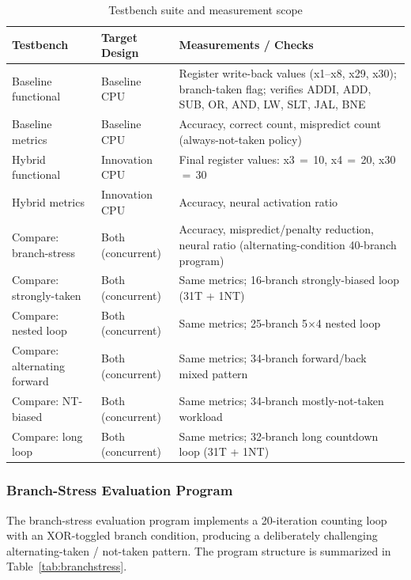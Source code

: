 \documentclass[12pt,a4paper]{article}
\begin{document}
\begin{table}[htbp]
  \centering
  \caption{Testbench suite and measurement scope}
  \label{tab:testbenches}
  \begin{tabularx}{\linewidth}{lYY}
    \toprule
    \textbf{Testbench} & \textbf{Target Design} & \textbf{Measurements / Checks} \\
    \midrule
    Baseline functional
      & Baseline CPU
      & Register write-back values (x1--x8, x29, x30);
        branch-taken flag; verifies ADDI, ADD, SUB, OR, AND, LW, SLT, JAL, BNE \\[2pt]
    Baseline metrics
      & Baseline CPU
      & Accuracy, correct count, mispredict count
        (always-not-taken policy) \\[2pt]
    Hybrid functional
      & Innovation CPU
      & Final register values: x3\,$=$\,10, x4\,$=$\,20, x30\,$=$\,30 \\[2pt]
    Hybrid metrics
      & Innovation CPU
      & Accuracy, neural activation ratio \\[2pt]
    Compare: branch-stress
      & Both (concurrent)
      & Accuracy, mispredict/penalty reduction, neural ratio
        (alternating-condition 40-branch program) \\[2pt]
    Compare: strongly-taken
      & Both (concurrent)
      & Same metrics; 16-branch strongly-biased loop (31T + 1NT) \\[2pt]
    Compare: nested loop
      & Both (concurrent)
      & Same metrics; 25-branch 5$\times$4 nested loop \\[2pt]
    Compare: alternating forward
      & Both (concurrent)
      & Same metrics; 34-branch forward/back mixed pattern \\[2pt]
    Compare: NT-biased
      & Both (concurrent)
      & Same metrics; 34-branch mostly-not-taken workload \\[2pt]
    Compare: long loop
      & Both (concurrent)
      & Same metrics; 32-branch long countdown loop (31T + 1NT) \\
    \bottomrule
  \end{tabularx}
\end{table}

\subsubsection{Branch-Stress Evaluation Program}

The branch-stress evaluation program implements a 20-iteration counting loop
with an XOR-toggled branch condition, producing a deliberately challenging
alternating-taken / not-taken pattern. The program structure is summarized in
Table~\ref{tab:branchstress}.
\end{document}
